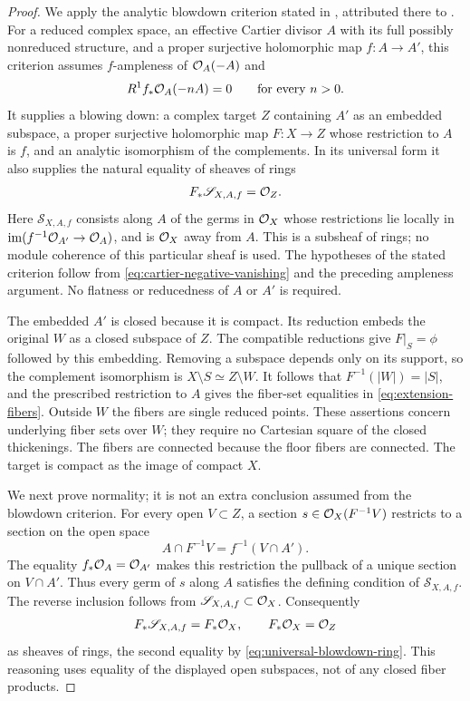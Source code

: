 \begin{proof}
We apply the analytic blowdown criterion stated in
\cite[Theorem~4.2, p.~14]{DasHacon2024OnMMP}, attributed there to
\cite[Theorem~2, p.~495]{Fujiki1975}.  For a reduced complex space,
an effective Cartier divisor \(A\) with its full possibly nonreduced
structure, and a proper surjective holomorphic map \(f:A\to A'\),
this criterion assumes \(f\)-ampleness of \(\mathcal O_A(-A)\) and
\[
 R^1f_*\mathcal O_A(-nA)=0\qquad\hbox{for every }n>0.
\]
It supplies a blowing down: a complex target \(Z\) containing \(A'\)
as an embedded subspace, a proper surjective holomorphic map
\(F:X\to Z\) whose restriction to \(A\) is \(f\), and an analytic
isomorphism of the complements.  In its universal form it also supplies
the natural equality of sheaves of rings
\begin{equation}\label{eq:universal-blowdown-ring}
 F_*\mathscr S_{X,A,f}=\mathcal O_Z.
\end{equation}
Here \(\mathscr S_{X,A,f}\) consists along \(A\) of the germs in
\(\mathcal O_X\) whose restrictions lie locally in
\(\operatorname{im}(f^{-1}\mathcal O_{A'}\to\mathcal O_A)\), and is \(\mathcal O_X\)
away from \(A\).  This is a subsheaf of rings; no module coherence of
this particular sheaf is used.  The hypotheses of the stated criterion
follow from \eqref{eq:cartier-negative-vanishing} and the preceding
ampleness argument.  No flatness or reducedness of \(A\) or \(A'\)
is required.

The embedded \(A'\) is closed because it is compact.  Its reduction
embeds the original \(W\) as a closed subspace of \(Z\).  The
compatible reductions give \(F|_S=\phi\) followed by this embedding.
Removing a subspace depends only on its support, so the complement
isomorphism is \(X\setminus S\simeq Z\setminus W\).  It follows
that \(F^{-1}(|W|)=|S|\), and the prescribed restriction to \(A\)
gives the fiber-set equalities in \eqref{eq:extension-fibers}.
Outside \(W\) the fibers are single reduced points.  These assertions
concern underlying fiber sets over \(W\); they require no Cartesian
square of the closed thickenings.  The fibers are connected because
the floor fibers are connected.  The target is compact as the image of
compact \(X\).

We next prove normality; it is not an extra conclusion assumed from the
blowdown criterion.  For every open \(V\subset Z\), a section
\(s\in\mathcal O_X(F^{-1}V)\) restricts to a section on the open space
\[
 A\cap F^{-1}V=f^{-1}(V\cap A').
\]
The equality \(f_*\mathcal O_A=\mathcal O_{A'}\) makes this restriction the pullback
of a unique section on \(V\cap A'\).  Thus every germ of \(s\) along
\(A\) satisfies the defining condition of \(\mathscr S_{X,A,f}\).
The reverse inclusion follows from \(\mathscr S_{X,A,f}\subset\mathcal O_X\).
Consequently
\[
 F_*\mathscr S_{X,A,f}=F_*\mathcal O_X,
 \qquad F_*\mathcal O_X=\mathcal O_Z
\]
as sheaves of rings, the second equality by
\eqref{eq:universal-blowdown-ring}.  This reasoning uses equality of
the displayed open subspaces, not of any closed fiber products.


\end{proof}
